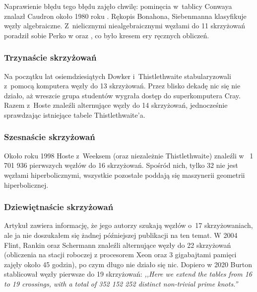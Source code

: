 Naprawienie błędu tego błędu zajęło chwilę: pominęcia w~tablicy Conwaya znalazł Caudron około 1980 roku \cite{caudron82}.
%
Rękopis \cite{bonahon89} Bonahona, Siebenmanna klasyfikuje węzły algebraiczne.
%
%
Z~nielicznymi niealgebraicznymi węzłami do 11 skrzyżowań poradził sobie Perko w \cite{perko80} oraz \cite{perko82}, co było kresem ery ręcznych obliczeń.
%


\subsubsection{Trzynaście skrzyżowań}
Na początku lat osiemdziesiątych Dowker i~Thistlethwaite \cite{dowker83} stabularyzowali z~pomocą komputera węzły do 13 skrzyżowań.
%
%
Przez blisko dekadę nic się nie działo, aż wreszcie grupa studentów wygrała dostęp do superkomputera Cray.
Razem z~Hoste znaleźli alternujące węzły do 14 skrzyżowań, jednocześnie sprawdzając istniejące tabele Thistlethwaite'a.
%

\subsubsection{Szesnaście skrzyżowań}
Około roku 1998 Hoste z~Weeksem (oraz niezależnie Thistlethwaite) znaleźli w~\cite{thistlethwaite98} 1 701 936 pierwszych węzłów do 16 skrzyżowań.
%
%
%
Spośród nich, tylko 32 nie jest węzłami hiperbolicznymi, wszystkie pozostałe poddają się maszynerii geometrii hiperbolicznej.

\subsubsection{Dziewiętnaście skrzyżowań}
Artykuł \cite{thistlethwaite98} zawiera informację, że jego autorzy szukają węzłów o~17 skrzyżowaniach, ale ja nie doszukałem się żadnej późniejszej publikacji na ten temat.
%
%
%
W 2004 Flint, Rankin oraz Schermann \cite{rankin04} znaleźli alternujące węzły do 22 skrzyżowań (obliczenia na stacji roboczej z procesorem Xeon oraz 3 gigabajtami pamięci zajęły około 45 godzin), po czym długo nie działo się nic.
%
%
%
Dopiero w 2020 Burton \cite{burton20} stablicował węzły pierwsze do 19 skrzyżowań: \emph{,,Here we extend the tables from 16 to 19 crossings, with a total of 352 152 252 distinct non-trivial prime knots.''}
%

